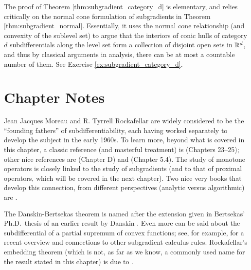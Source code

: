 
The proof of Theorem \ref{thm:subgradient_category_d} is elementary, and relies
critically on the normal cone formulation of subgradients in Theorem
\ref{thm:subgradient_normal}. Essentially, it uses the normal cone relationship
(and convexity of the sublevel set) to argue that the interiors of 
conic hulls of category $d$ subdifferentials along the level set form a
collection of disjoint open sets in $\mathbb{R}^d$, and thus by classical arguments in
analysis, there can be at most a countable number of them. See Exercise
\ref{ex:subgradient_category_d}.   

\SkipTocEntry\section*{Chapter Notes}

Jean Jacques Moreau and R. Tyrrell Rockafellar are widely considered to be the
``founding fathers'' of subdifferentiability, each having worked separately to 
develop the subject in the early 1960s. To learn more, beyond what is covered in
this chapter, a classic reference (and masterful treatment) is
\cite{rockafellar1970convex} (Chapters 23--25); other nice references are 
\cite{hiriartUrruty2001fundamentals} (Chapter D) and \cite{bertsekas2009convex} 
(Chapter 5.4). The study of monotone operators is closely linked to the study of 
subgradients (and to that of proximal operators, which will be covered in the
next chapter). Two nice very books that develop this connection, from different 
perspectives (analytic versus algorithmic) are \cite{bauschke2011convex,
  ryu2022large}. 

The Danskin-Bertsekas theorem is named after the extension given in Bertsekas'
Ph.D.\ thesis \cite{bertsekas1971control} of an earlier result by Danskin
\cite{danskin1967theory}. Even more can be said about the subdifferential of a
partial supremum of convex functions; see, for example,
\cite{hantoute2008subdifferential} for a recent overview and connections to
other subgradient calculus rules. Rockafellar's embedding theorem (which is not, 
as far as we know, a commonly used name for the result stated in this chapter)
is due to \cite{rockafellar1966characterization}.

